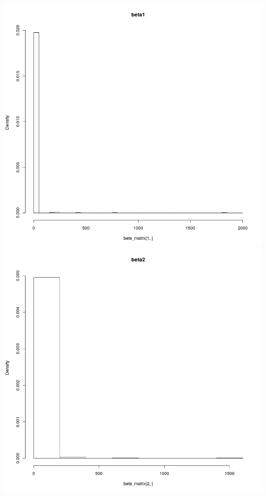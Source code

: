 \documentclass[a4paper,11pt]{article}
\begin{document}
\includegraphics[scale=.35]{beta43_1.png} 
\includegraphics[scale=.35]{beta43_2.png} 
\end{document}
